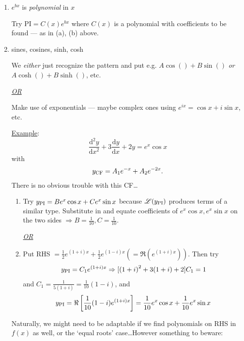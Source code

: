 \documentclass[12pt]{report}
\theoremstyle{definition}
\begin{document}
\begin{enumerate}[label = (\alph*)]
\begin{enumerate}[label = (\roman*)]
        \end{enumerate}
        
            \item $e^{bx}$ is \emph{polynomial} in $x$
                
                Try $\text{PI} = C(x) e^{bx}$ where $C(x)$ is a polynomial with coefficients to be found
                --- as in (a), (b) above.

            \item sines, cosines, sinh, cosh

                We \emph{either} just recognize the pattern and put e.g. 
                $A\cos{()} + B\sin{()}$ \emph{or} $A\cosh{()} + B\sinh{()}$, etc.

                \emph{\underline{OR}} 

                Make use of exponentials ---
                maybe complex ones using $e^{ix} = \cos{x} + i \sin{x}$, etc.
                
                \underline{Example}: \[
                    \frac{\mathrm{d}^{2}y}{\mathrm{d}x^{2}} + 3 \frac{\mathrm{d}y}{\mathrm{d}x} + 2y 
                    = e^{x}\cos{x}
                \]
                with \[
                    y_{\textnormal{CF}} = A_1 e^{-x} + A_2 e^{-2x}.
                \]
                There is no obvious trouble with this CF\ldots

                \begin{enumerate}[label = (\arabic*)]
                    \item Try $y_{\textnormal{PI}} = B e^{x} \cos{x} + C e^{x} \sin{x}$
                        because $\mathscr{L} (y_{\textnormal{PI}})$ produces terms of a similar type.
                        Substitute in and equate coefficients of $e^{x} \cos{x}, e^{x}\sin{x}$
                        on the two sides $\Rightarrow B = \frac{1}{10}, C = \frac{1}{10}$.

                        \emph{\underline{OR}}

                    \item Put RHS $= \frac{1}{2} e^{(1 + i)x} + \frac{1}{2} e^{(1 - i)x}
                        (=\Re \left( e^{(1 + i)x} \right))$. Then try \[
                            y_{\textnormal{PI}} = C_1 e^{(1 + i)x} 
                            \Rightarrow [{(1 + i)}^{2} + 3(1 + i) + 2] C_1 = 1
                        \]
                        and $C_1 = \frac{1}{5(1 + i)} = \frac{1}{10}(1 - i)$,
                        and \[
                            y_{\textnormal{PI}} = \Re \left[\frac{1}{10} (1 - i) e^{(1 + i)x}\right] 
                            = \frac{1}{10} e^{x}\cos{x} + \frac{1}{10}e^{x} \sin{x}
                        \]
                \end{enumerate}
                Naturally, we might need to be adaptable if we find polynomials on RHS in $f(x)$
                as well, or the `equal roots' case\ldots However something to beware:


\end{enumerate}
\end{document}

